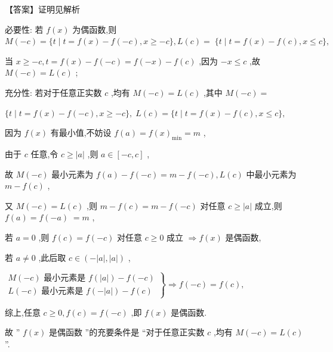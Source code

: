 \documentclass[10pt]{article}
\begin{document}
【答案】证明见解析

必要性: 若 \(f\left( x\right)\) 为偶函数,则 \(M\left( {-c}\right)  = \{ t \mid  t = f\left( x\right)  - f\left( {-c}\right) ,x \geq   - c\} ,L\left( c\right)  = \; \{ t \mid  t = f\left( x\right)  - f\left( c\right) ,x \leq  c\} ,\)

当 \(x \geq   - c,t = f\left( x\right)  - f\left( {-c}\right)  = f\left( {-x}\right)  - f\left( c\right)\) ,因为 \(- x \leq  c\) ,故 \(M\left( {-c}\right)  = L\left( c\right)\) ;

充分性: 若对于任意正实数 \(c\) ,均有 \(M\left( {-c}\right)  = L\left( c\right)\) ,其中 \(M\left( {-c}\right)  =\)

\(\{ t \mid  t = f\left( x\right)  - f\left( {-c}\right) ,x \geq   - c\} ,\;L\left( c\right)  = \{ t \mid  t = f\left( x\right)  - f\left( c\right) ,x \leq  c\} ,\)

因为 \(f\left( x\right)\) 有最小值,不妨设 \(f\left( a\right)  = f{\left( x\right) }_{\min } = m\) ,

由于 \(c\) 任意,令 \(c \geq  \left| a\right|\) ,则 \(a \in  \left\lbrack  {-c,c}\right\rbrack\) ,

故 \(M\left( {-c}\right)\) 最小元素为 \(f\left( a\right)  - f\left( {-c}\right)  = m - f\left( {-c}\right) ,L\left( c\right)\) 中最小元素为 \(m - f\left( c\right)\) ,

又 \(M\left( {-c}\right)  = L\left( c\right)\) ,则 \(m - f\left( c\right)  = m - f\left( {-c}\right)\) 对任意 \(c \geq  \left| a\right|\) 成立,则 \(f\left( a\right)  = f\left( {-a}\right) \; = m\) ,

若 \(a = 0\) ,则 \(f\left( c\right)  = f\left( {-c}\right)\) 对任意 \(c \geq  0\) 成立 \(\Rightarrow  f\left( x\right)\) 是偶函数,

若 \(a \neq  0\) ,此后取 \(c \in  \left( {-\left| a\right| ,\left| a\right| }\right)\) ,

\(\left. \begin{array}{l} M\left( {-c}\right) \text{ 最小元素是 }f\left( \left| a\right| \right)  - f\left( {-c}\right) \\  L\left( {-c}\right) \text{ 最小元素是 }f\left( {-\left| a\right| }\right)  - f\left( c\right)  \end{array}\right\}   \Rightarrow  f\left( {-c}\right)  = f\left( c\right) ,\)

综上,任意 \(c \geq  0,f\left( c\right)  = f\left( {-c}\right)\) ,即 \(f\left( x\right)\) 是偶函数.

故 ” \(f\left( x\right)\) 是偶函数 ”的充要条件是 “对于任意正实数 \(c\) ,均有 \(M\left( {-c}\right)  = L\left( c\right)\) ”.
\end{document}
